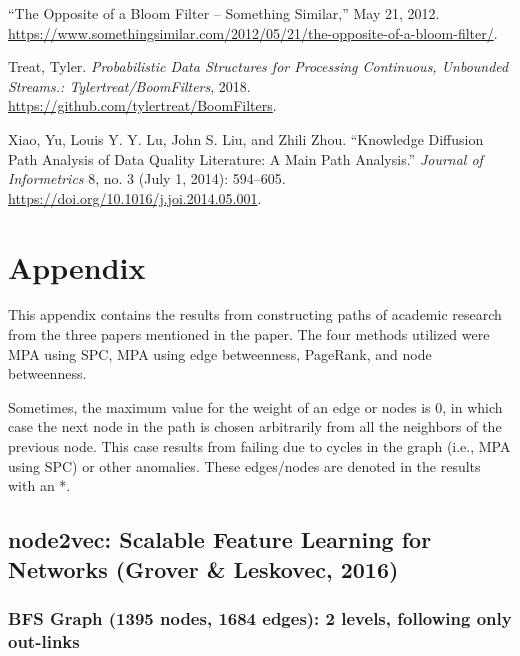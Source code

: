 \documentclass[lettepaper,]{article}
\begin{document}
\leavevmode\hypertarget{ref-OppositeBloomFilter2012}{}%
``The Opposite of a Bloom Filter -- Something Similar,'' May 21, 2012.
\url{https://www.somethingsimilar.com/2012/05/21/the-opposite-of-a-bloom-filter/}.

\leavevmode\hypertarget{ref-treatProbabilisticDataStructures2018}{}%
Treat, Tyler. \emph{Probabilistic Data Structures for Processing
Continuous, Unbounded Streams.: Tylertreat/BoomFilters}, 2018.
\url{https://github.com/tylertreat/BoomFilters}.

\leavevmode\hypertarget{ref-xiaoKnowledgeDiffusionPath2014}{}%
Xiao, Yu, Louis Y. Y. Lu, John S. Liu, and Zhili Zhou. ``Knowledge
Diffusion Path Analysis of Data Quality Literature: A Main Path
Analysis.'' \emph{Journal of Informetrics} 8, no. 3 (July 1, 2014):
594--605. \url{https://doi.org/10.1016/j.joi.2014.05.001}.

\hypertarget{appendix}{%
\section{Appendix}\label{appendix}}

This appendix contains the results from constructing paths of academic
research from the three papers mentioned in the paper. The four methods
utilized were MPA using SPC, MPA using edge betweenness, PageRank, and
node betweenness.

Sometimes, the maximum value for the weight of an edge or nodes is 0, in
which case the next node in the path is chosen arbitrarily from all the
neighbors of the previous node. This case results from failing due to
cycles in the graph (i.e., MPA using SPC) or other anomalies. These
edges/nodes are denoted in the results with an *.

\hypertarget{node2vec-scalable-feature-learning-for-networks-grover-leskovec-2016}{%
\subsection{node2vec: Scalable Feature Learning for Networks (Grover \&
Leskovec,
2016)}\label{node2vec-scalable-feature-learning-for-networks-grover-leskovec-2016}}

\hypertarget{bfs-graph-1395-nodes-1684-edges-2-levels-following-only-out-links}{%
\subsubsection{BFS Graph (1395 nodes, 1684 edges): 2 levels, following
only
out-links}\label{bfs-graph-1395-nodes-1684-edges-2-levels-following-only-out-links}}
\end{document}
